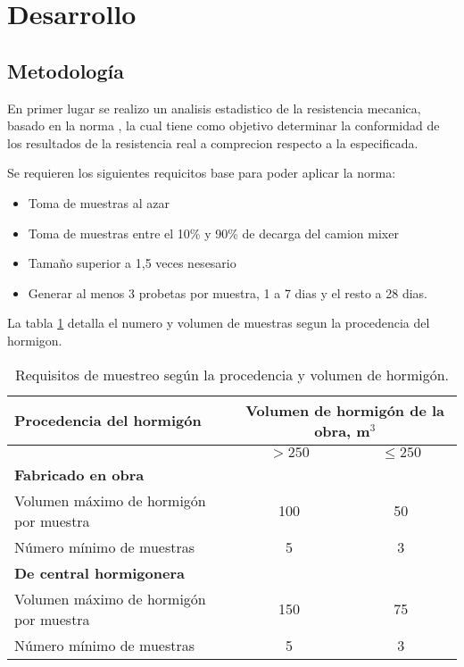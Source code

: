 \section{Desarrollo}

\subsection{Metodología}

En primer lugar se realizo un analisis estadistico de la resistencia mecanica, basado en la norma \cite{NCh1998}, la cual tiene como objetivo determinar la conformidad de los resultados de la resistencia real a comprecion respecto a la especificada.

Se requieren los siguientes requicitos base para poder aplicar la norma:

\begin{itemize}
    \item Toma de muestras al azar
    \item Toma de muestras entre el 10\% y 90\% de decarga del camion mixer
    \item Tamaño superior a 1,5 veces nesesario
    \item Generar al menos 3 probetas por muestra, 1 a 7 dias y el resto a 28 dias.
\end{itemize}

La tabla \ref{tab:muestreo} detalla el numero y volumen de muestras segun la procedencia del hormigon.

\begin{table}[H]
\centering
\begin{tabular}{|l|c|c|}
\hline
\textbf{Procedencia del hormigón} & \multicolumn{2}{c|}{\textbf{Volumen de hormigón de la obra, m$^3$}} \\ \hline
                                  & $> 250$ & $\leq 250$ \\ \hline
\textbf{Fabricado en obra}        &         &           \\ \hline
Volumen máximo de hormigón por muestra & 100     & 50        \\ \hline
Número mínimo de muestras              & 5       & 3         \\ \hline
\textbf{De central hormigonera}   &         &           \\ \hline
Volumen máximo de hormigón por muestra & 150     & 75        \\ \hline
Número mínimo de muestras              & 5       & 3         \\ \hline
\end{tabular}
\caption{Requisitos de muestreo según la procedencia y volumen de hormigón.}
\label{tab:muestreo}
\end{table}

